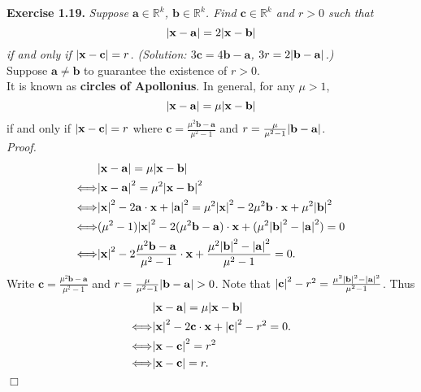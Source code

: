 \documentclass{article}
\begin{document}



\textbf{Exercise 1.19.}
\emph{Suppose $\mathbf{a} \in \mathbb{R}^k$, $\mathbf{b} \in \mathbb{R}^k$.
Find $\mathbf{c} \in \mathbb{R}^k$ and $r > 0$ such that
$$\abs{\mathbf{x} - \mathbf{a}}
= 2 \abs{\mathbf{x} - \mathbf{b}}$$
if and only if $\abs{\mathbf{x} - \mathbf{c}} = r$.
(Solution: $3\mathbf{c} = 4\mathbf{b} - \mathbf{a}$,
$3r = 2\abs{\mathbf{b} - \mathbf{a}}$.)} \\

Suppose $\mathbf{a} \neq \mathbf{b}$ to guarantee the existence of $r > 0$. \\

It is known as \textbf{circles of Apollonius}.
In general, for any $\mu > 1$,
$$\abs{\mathbf{x} - \mathbf{a}}
= \mu \abs{\mathbf{x} - \mathbf{b}}$$
if and only if $\abs{\mathbf{x} - \mathbf{c}} = r$
where
$\mathbf{c}
= \frac{\mu^2\mathbf{b}-\mathbf{a}}{\mu^2 - 1}$
and $r = \frac{\mu}{\mu^2-1}\abs{\mathbf{b} - \mathbf{a}}$. \\

\emph{Proof.}
\begin{align*}
&\abs{\mathbf{x} - \mathbf{a}}
= \mu \abs{\mathbf{x} - \mathbf{b}} \\
\Longleftrightarrow&
\abs{\mathbf{x} - \mathbf{a}}^2
= \mu^2 \abs{\mathbf{x} - \mathbf{b}}^2 \\
\Longleftrightarrow&
\abs{\mathbf{x}}^2 -2\mathbf{a}\cdot\mathbf{x} + \abs{\mathbf{a}}^2
= \mu^2\abs{\mathbf{x}}^2 -2\mu^2\mathbf{b}\cdot\mathbf{x} + \mu^2\abs{\mathbf{b}}^2 \\
\Longleftrightarrow&
(\mu^2-1)\abs{\mathbf{x}}^2
  -2(\mu^2\mathbf{b}-\mathbf{a})\cdot\mathbf{x}
  +(\mu^2\abs{\mathbf{b}}^2 - \abs{\mathbf{a}}^2)
= 0 \\
\Longleftrightarrow&
\abs{\mathbf{x}}^2
  - 2\frac{\mu^2\mathbf{b}-\mathbf{a}}{\mu^2-1}\cdot\mathbf{x}
  + \frac{\mu^2\abs{\mathbf{b}}^2 - \abs{\mathbf{a}}^2}{\mu^2-1}
= 0.
\end{align*}
Write $\mathbf{c}
= \frac{\mu^2\mathbf{b}-\mathbf{a}}{\mu^2 - 1}$
and $r = \frac{\mu}{\mu^2-1}\abs{\mathbf{b} - \mathbf{a}} > 0$.
Note that
$\abs{\mathbf{c}}^2 - r^2 = \frac{\mu^2\abs{\mathbf{b}}^2-\abs{\mathbf{a}}^2}{\mu^2-1}$.
Thus
\begin{align*}
&\abs{\mathbf{x} - \mathbf{a}}
= \mu \abs{\mathbf{x} - \mathbf{b}} \\
\Longleftrightarrow&
\abs{\mathbf{x}}^2
  - 2 \mathbf{c}\cdot\mathbf{x}
  + \abs{\mathbf{c}}^2 - r^2
= 0. \\
\Longleftrightarrow&
\abs{\mathbf{x} - \mathbf{c}}^2 = r^2 \\
\Longleftrightarrow&
\abs{\mathbf{x} - \mathbf{c}} = r.
\end{align*}
$\Box$ \\\\
\end{document}
